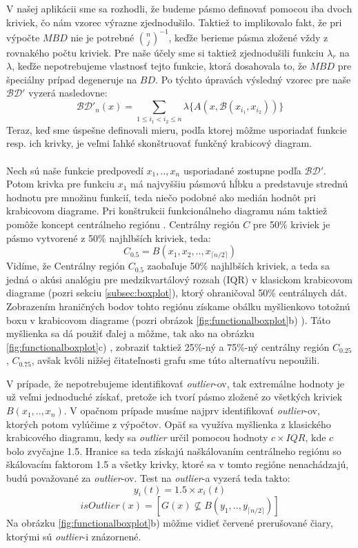 V našej aplikácii sme sa rozhodli, že budeme pásmo definovať pomocou iba dvoch kriviek, čo nám vzorec výrazne zjednodušilo. Taktiež to implikovalo fakt, že pri výpočte $ MBD $ nie je potrebné $ {n \choose j}^{-1} $, keďže berieme pásma zložené vždy z rovnakého počtu kriviek. Pre naše účely sme si taktiež zjednodušili funkciu $ \lambda_{r} $ na $ \lambda $, keďže nepotrebujeme vlastnosť tejto funkcie, ktorá dosahovala to, že $ MBD $ pre špeciálny prípad degeneruje na $ BD $. Po týchto úpravách výsledný vzorec pre naše $ \mathcal{BD}' $ vyzerá nasledovne:
\[
	\mathcal{BD}'_{n}(x) = \sum_{1 \leq i_{1} < i_{2} \leq n} \lambda\{ A(x, \mathcal{B}(x_{i_{1}},x_{i_{2}})) \}
\]
Teraz, keď sme úspešne definovali mieru, podľa ktorej môžme usporiadať funkcie resp. ich krivky, je veľmi ľahké skonštruovať funkčný krabicový diagram.

\paragraph{}
Nech sú naše funkcie predpovedí $ x_{1},.., x_{n} $ usporiadané zostupne podľa $ \mathcal{BD}' $. Potom krivka pre funkciu $ x_{1} $ má najvyššiu pásmovú hĺbku a predstavuje strednú hodnotu pre množinu funkcií, teda niečo podobné ako medián hodnôt pri krabicovom diagrame. Pri konštrukcii funkcionálneho diagramu nám taktiež pomôže koncept centrálneho regiónu \cite{Liu}. Centrálny región $ C $ pre 50\% kriviek je pásmo vytvorené z 50\% najhlbších kriviek, teda:
\[
	C_{0.5} = B(x_{1}, x_{2}, .., x_{\lceil n / 2 \rceil} )
\] 
Vidíme, že Centrálny región $ C_{0.5} $ zaobaľuje 50\% najhlbších kriviek, a teda sa jedná o akúsi analógiu pre medzikvartálový rozsah (IQR) v klasickom krabicovom diagrame (pozri sekciu \ref{subsec:boxplot}), ktorý ohraničoval 50\% centrálnych dát. Zobrazením hraničných bodov tohto regiónu získame obálku myšlienkovo totožnú boxu v krabicovom diagrame (pozri obrázok \ref{fig:functionalboxplot}b) ). Táto myšlienka sa dá použiť ďalej a môžme, tak ako na obrázku \ref{fig:functionalboxplot}c) , zobraziť taktiež 25\%-ný a 75\%-ný centrálny región $ C_{0.25} $, $ C_{0.75} $, avšak kvôli nižšej čitateľnosti grafu sme túto alternatívu nepoužili.

V prípade, že nepotrebujeme identifikovať \textit{outlier}-ov, tak extremálne hodnoty je už veľmi jednoduché získať, pretože ich tvorí pásmo zložené zo všetkých kriviek $ B(x_{1}, .., x_{n}) $. V opačnom prípade musíme najprv identifikovať \textit{outlier}-ov, ktorých potom vylúčime z výpočtov. Opäť sa využíva myšlienka z klasického krabicového diagramu, kedy sa \textit{outlier} určil pomocou hodnoty $ c \times IQR $, kde $ c $ bolo zvyčajne 1.5. Hranice sa teda získajú naškálovaním centrálneho regiónu so škálovacím faktorom 1.5 a všetky krivky, ktoré sa v tomto regióne nenachádzajú, budú považované za \textit{outlier}-ov. Test na \textit{outlier}-a vyzerá teda takto:
\[	y_{i}(t) = 1.5 \times x_{i}(t) \]
\[	isOutlier(x) = [ G(x) \nsubseteq B(y_{1},..,y_{\lceil n / 2 \rceil}) ] \]
Na obrázku \ref{fig:functionalboxplot}b) môžme vidieť červené prerušované čiary, ktorými sú \textit{outlier}-i znázornené.

